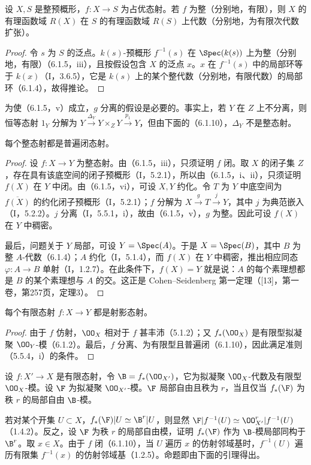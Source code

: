 设 $X,S$ 是整预概形，$f:X\to S$ 为占优态射。若 $f$ 为整（分别地，有限），则 $X$ 的有理函数域 $R(X)$ 在 $S$ 的有理函数域 $R(S)$ 上代数（分别地，为有限次代数扩张）。
\begin{proof}
令 $s$ 为 $S$ 的泛点。$k(s)$-预概形 $f^{-1}(s)$ 在 $\Spec(k(s))$ 上为整（分别地，有限）（6.1.5，iii），且按假设包含 $X$ 的泛点 $x$。$x$ 在 $f^{-1}(s)$ 中的局部环等于 $k(x)$（I，3.6.5），它是 $k(s)$ 上的某个整代数（分别地，有限代数）的局部环（6.1.4），故得推论。
\end{proof}

为使（6.1.5，v）成立，$g$ 分离的假设是必要的。事实上，若 $Y$ 在 $Z$ 上不分离，则恒等态射 $1_Y$ 分解为
$Y\xrightarrow{\Delta_Y}Y\times_Z Y\xrightarrow{p_1}Y$，但由下面的（6.1.10），$\Delta_Y$ 不是整态射。

每个整态射都是普遍闭态射。
\begin{proof}
设 $f:X\to Y$ 为整态射。由（6.1.5，iii），只须证明 $f$ 闭。取 $X$ 的闭子集 $Z$，存在具有该底空间的闭子预概形（I，5.2.1），所以由（6.1.5，i、ii），只须证明 $f(X)$ 在 $Y$ 中闭。由（6.1.5，vi），可设 $X,Y$ 约化。令 $T$ 为 $Y$ 中底空间为 $\overline{f(X)}$ 的约化闭子预概形（I，5.2.1）；$f$ 分解为
$X\xrightarrow{g}T\xrightarrow{j}Y$，其中 $j$ 为典范嵌入（I，5.2.2）。$j$ 分离（I，5.5.1，i），故由（6.1.5，v），$g$ 为整。因此可设 $f(X)$ 在 $Y$ 中稠密。

最后，问题关于 $Y$ 局部，可设 $Y=\Spec(A)$。于是 $X=\Spec(B)$，其中 $B$ 为整 $A$-代数（6.1.4）；$A$ 约化（I，5.1.4），而 $f(X)$ 在 $Y$ 中稠密，推出相应同态 $\varphi:A\to B$ 单射（I，1.2.7）。在此条件下，$f(X)=Y$ 就是说：$A$ 的每个素理想都是 $B$ 的某个素理想与 $A$ 的交。这正是 Cohen--Seidenberg 第一定理（[13]，第一卷，第257页，定理3）。
\end{proof}

每个有限态射 $f:X\to Y$ 都是射影态射。
\begin{proof}
由于 $f$ 仿射，$\OO_X$ 相对于 $f$ 甚丰沛（5.1.2）；又 $f_*(\OO_X)$ 是有限型拟凝聚 $\OO_Y$-模（6.1.2）。最后，$f$ 分离、为有限型且普遍闭（6.1.10），因此满足准则（5.5.4，i）的条件。
\end{proof}

设 $f:X'\to X$ 是有限态射，令 $\B=f_*(\OO_{X'})$，它为拟凝聚 $\OO_X$-代数及有限型 $\OO_X$-模。设 $\F$ 为拟凝聚 $\OO_{X'}$-模。$\F$ 局部自由且秩为 $r$，当且仅当 $f_*(\F)$ 为秩 $r$ 的局部自由 $\B$-模。

若对某个开集 $U\subset X$，$f_*(\F)|U\simeq\B^r|U$，则显然
$\F|f^{-1}(U)\simeq\OO_{X'}^r|f^{-1}(U)$（1.4.2）。反之，设 $\F$ 为秩 $r$ 的局部自由模，证明 $f_*(\F)$ 作为 $\B$-模局部同构于 $\B^r$。取 $x\in X$。由于 $f$ 闭（6.1.10），当 $U$ 遍历 $x$ 的仿射邻域基时，$f^{-1}(U)$ 遍历有限集 $f^{-1}(x)$ 的仿射邻域基（1.2.5）。命题即由下面的引理得出。

